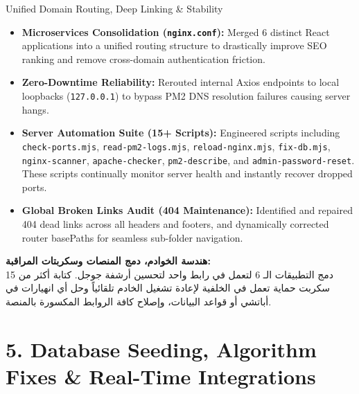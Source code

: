 \documentclass[11pt,a4paper]{article}
\begin{document}
\begin{topicbox}{Unified Domain Routing, Deep Linking \& Stability}
\begin{itemize}[leftmargin=*]
\item \textbf{Microservices Consolidation (\texttt{nginx.conf}):} Merged 6 distinct React applications into a unified routing structure to drastically improve SEO ranking and remove cross-domain authentication friction.
\item \textbf{Zero-Downtime Reliability:} Rerouted internal Axios endpoints to local loopbacks (\texttt{127.0.0.1}) to bypass PM2 DNS resolution failures causing server hangs.
\item \textbf{Server Automation Suite (15+ Scripts):} Engineered scripts including \texttt{check-ports.mjs}, \texttt{read-pm2-logs.mjs}, \texttt{reload-nginx.mjs}, \texttt{fix-db.mjs}, \texttt{nginx-scanner}, \texttt{apache-checker}, \texttt{pm2-describe}, and \texttt{admin-password-reset}. These scripts continually monitor server health and instantly recover dropped ports.
\item \textbf{Global Broken Links Audit (404 Maintenance):} Identified and repaired 404 dead links across all headers and footers, and dynamically corrected router basePaths for seamless sub-folder navigation.
\end{itemize}
\end{topicbox}
\begin{arabicbox}
\textbf{\textarabic{هندسة الخوادم، دمج المنصات وسكربتات المراقبة:}}\\
\textarabic{دمج التطبيقات الـ 6 لتعمل في رابط واحد لتحسين أرشفة جوجل. كتابة أكثر من 15 سكربت حماية تعمل في الخلفية لإعادة تشغيل الخادم تلقائياً وحل أي انهيارات في أباتشي أو قواعد البيانات، وإصلاح كافة الروابط المكسورة بالمنصة.}
\end{arabicbox}

\section{5. Database Seeding, Algorithm Fixes \& Real-Time Integrations}
\end{document}
